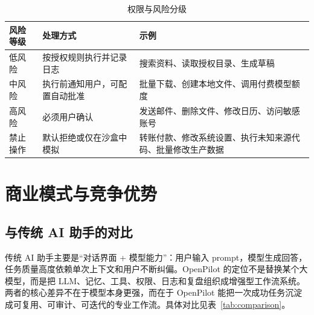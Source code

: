 \documentclass[12pt,a4paper]{ctexart}
\begin{document}
\begin{table}[htbp]
  \centering
  \begin{tabularx}{\textwidth}{p{3cm} X X}
    \toprule
    \textbf{风险等级} & \textbf{处理方式} & \textbf{示例} \\
    \midrule
    低风险 & 按授权规则执行并记录日志 & 搜索资料、读取授权目录、生成草稿 \\
    中风险 & 执行前通知用户，可配置自动批准 & 批量下载、创建本地文件、调用付费模型额度 \\
    高风险 & 必须用户确认 & 发送邮件、删除文件、修改日历、访问敏感账号 \\
    禁止操作 & 默认拒绝或仅在沙盒中模拟 & 转账付款、修改系统设置、执行未知来源代码、批量修改生产数据 \\
    \bottomrule
  \end{tabularx}
  \caption{权限与风险分级}
  \label{tab:risk}
\end{table}

\section{商业模式与竞争优势}

\subsection{与传统 AI 助手的对比}

传统 AI 助手主要是“对话界面 + 模型能力”：用户输入 prompt，模型生成回答，任务质量高度依赖单次上下文和用户不断纠偏。OpenPilot 的定位不是替换某个大模型，而是把 LLM、记忆、工具、权限、日志和复盘组织成增强型工作流系统。两者的核心差异不在于模型本身更强，而在于 OpenPilot 能把一次成功任务沉淀成可复用、可审计、可迭代的专业工作流。具体对比见表~\ref{tab:comparison}。
\end{document}

